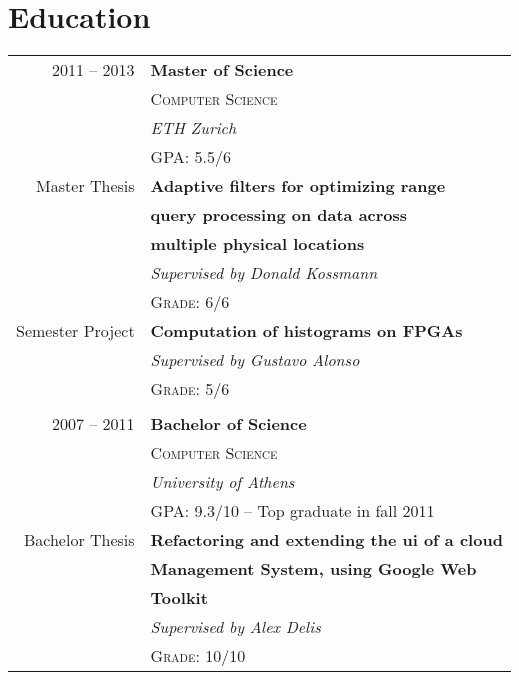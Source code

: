 \documentclass[10pt]{article} %
\begin{document}
\begin{minipage}[t]{0.5\textwidth} %
\vspace{0pt} %
	



\section{Education} 

\begin{tabular}{rl} %



2011 -- 2013 & \textbf{Master of Science} \\ 
& \textsc{Computer Science} \\ 
& \textit{ETH Zurich}\\
 \small  & GPA: 5.5/6 \\
Master Thesis
& \textbf{Adaptive filters for optimizing range}\\
& \textbf{query processing on data across}\\
& \textbf{multiple physical locations}\\
& \textit{Supervised by Donald Kossmann}\\
& \textsc{Grade: 6/6}\\
Semester Project
& \textbf{Computation of histograms on FPGAs}\\
& \textit{Supervised by Gustavo Alonso}\\
& \textsc{Grade: 5/6}\\
&\\
	 


2007 -- 2011 & \textbf{Bachelor of Science}\\
& \textsc{Computer Science} \\
& \textit{University of Athens} \\
\small  & GPA: 9.3/10 -- Top graduate in fall 2011\\
Bachelor Thesis
& \textbf{Refactoring and extending the ui of a cloud}\\
& \textbf{Management System, using Google Web}\\
& \textbf{Toolkit}\\
& \textit{Supervised by Alex Delis}\\
& \textsc{Grade: 10/10}\\
	

\end{tabular}
\end{minipage}
\end{document}

